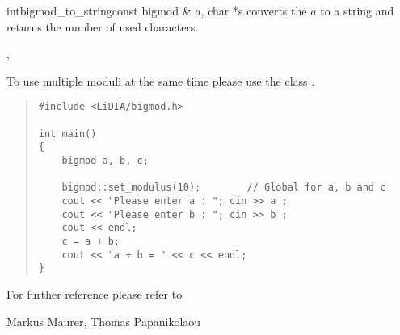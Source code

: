 \begin{fcode}{int}{bigmod_to_string}{const bigmod & $a$, char *s}
  converts the  $a$ to a string  and returns the number of used characters.
\end{fcode}



\SEEALSO

, 



\NOTES To use multiple moduli at the same time please use the class .



\EXAMPLES

\begin{quote}
\begin{verbatim}
#include <LiDIA/bigmod.h>

int main()
{
    bigmod a, b, c;

    bigmod::set_modulus(10);        // Global for a, b and c
    cout << "Please enter a : "; cin >> a ;
    cout << "Please enter b : "; cin >> b ;
    cout << endl;
    c = a + b;
    cout << "a + b = " << c << endl;
}
\end{verbatim}
\end{quote}

For further reference please refer to 



\AUTHOR

Markus Maurer, Thomas Papanikolaou
